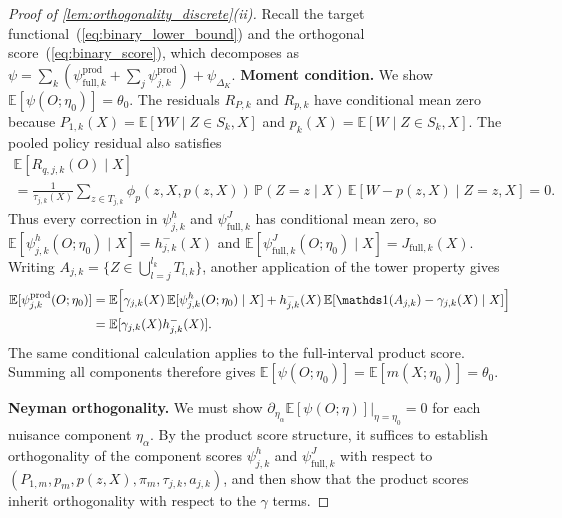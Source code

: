 \begin{proof}[Proof of \cref{lem:orthogonality_discrete}\textup{(ii)}]
Recall the target functional~(\ref{eq:binary_lower_bound}) and the orthogonal score~(\ref{eq:binary_score}), which decomposes as $\psi = \sum_{k}(\psi_{\mathrm{full},k}^{\mathrm{prod}} + \sum_{j}\psi_{j,k}^{\mathrm{prod}}) + \psi_{\Delta_K}$.
\medskip
\noindent\textbf{Moment condition.}
We show $\mathbb{E}[\psi(O;\eta_0)] = \theta_0$. The residuals $R_{P,k}$ and $R_{p,k}$ have conditional mean zero because $P_{1,k}(X)=\mathbb E[YW\mid Z\in S_k,X]$ and $p_k(X)=\mathbb E[W\mid Z\in S_k,X]$. The pooled policy residual also satisfies
\begin{multline*}
\mathbb E[R_{q,j,k}(O)\mid X] \\
=\frac1{\tau_{j,k}(X)}\sum_{z\in T_{j,k}}\phi_p(z,X,p(z,X))\,\mathbb P(Z=z\mid X)\,\mathbb E[W-p(z,X)\mid Z=z,X]
=0.
\end{multline*}
Thus every correction in $\psi_{j,k}^h$ and $\psi_{\mathrm{full},k}^J$ has conditional mean zero, so $\mathbb{E}[\psi_{j,k}^h(O;\eta_0)\mid X] = h_{j,k}^-(X)$ and $\mathbb{E}[\psi_{\mathrm{full},k}^J(O;\eta_0)\mid X] = J_{\mathrm{full},k}(X)$. Writing $A_{j,k}=\{Z\in\bigcup_{l=j}^{l_k}T_{l,k}\}$, another application of the tower property gives
\begin{align*}
    \mathbb E[\psi_{j,k}^{\mathrm{prod}}(O;\eta_0)]
    &=\mathbb E\!\left[\gamma_{j,k}(X)\,\mathbb E[\psi_{j,k}^h(O;\eta_0)\mid X]
      +h_{j,k}^-(X)\,\mathbb E[\indicator(A_{j,k})-\gamma_{j,k}(X)\mid X]\right] \\
    &=\mathbb E[\gamma_{j,k}(X)h_{j,k}^-(X)].
\end{align*}
The same conditional calculation applies to the full-interval product score. Summing all components therefore gives $\mathbb{E}[\psi(O;\eta_0)] = \mathbb{E}[m(X;\eta_0)] = \theta_0$.

\medskip
\noindent\textbf{Neyman orthogonality.}
We must show $\partial_{\eta_\alpha}\mathbb{E}[\psi(O;\eta)]\big|_{\eta=\eta_0} = 0$ for each nuisance component $\eta_\alpha$. By the product score structure, it suffices to establish orthogonality of the component scores $\psi_{j,k}^h$ and $\psi_{\mathrm{full},k}^J$ with respect to $(P_{1,m},p_m,p(z,X),\pi_m,\tau_{j,k},a_{j,k})$, and then show that the product scores inherit orthogonality with respect to the $\gamma$ terms.


\end{proof}
